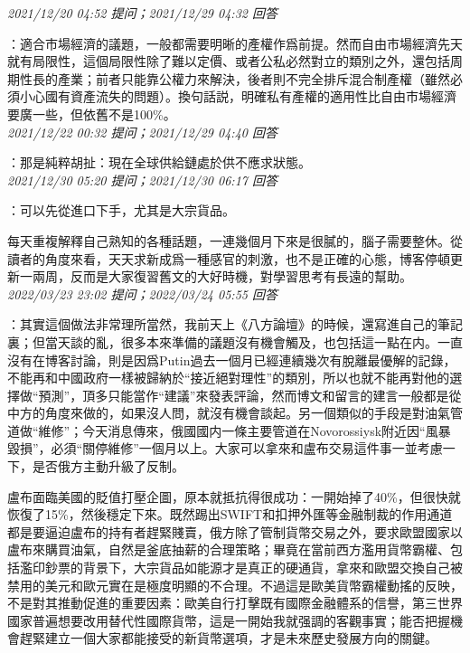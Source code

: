 \documentclass[twocolumn]{ctexart}
\begin{document}
\textit{\hfill\noindent\small 2021/12/20 04:52 提问；2021/12/29 04:32 回答}

：適合市場經濟的議題，一般都需要明晰的產權作爲前提。然而自由市場經濟先天就有局限性，這個局限性除了難以定價、或者公私必然對立的類別之外，還包括周期性長的產業；前者只能靠公權力來解決，後者則不完全排斥混合制產權（雖然必須小心國有資產流失的問題）。換句話説，明確私有產權的適用性比自由市場經濟要廣一些，但依舊不是100\%。
\\

\textit{\hfill\noindent\small 2021/12/22 00:32 提问；2021/12/29 04:40 回答}

：那是純粹胡扯：現在全球供給鏈處於供不應求狀態。
\\

\textit{\hfill\noindent\small 2021/12/30 05:20 提问；2021/12/30 06:17 回答}

：可以先從進口下手，尤其是大宗貨品。

每天重複解釋自己熟知的各種話題，一連幾個月下來是很膩的，腦子需要整休。從讀者的角度來看，天天求新成爲一種感官的刺激，也不是正確的心態，博客停頓更新一兩周，反而是大家復習舊文的大好時機，對學習思考有長遠的幫助。
\\

\textit{\hfill\noindent\small 2022/03/23 23:02 提问；2022/03/24 05:55 回答}

：其實這個做法非常理所當然，我前天上《八方論壇》的時候，還寫進自己的筆記裏；但當天談的亂，很多本來準備的議題沒有機會觸及，也包括這一點在内。一直沒有在博客討論，則是因爲Putin過去一個月已經連續幾次有脫離最優解的記錄，不能再和中國政府一樣被歸納於“接近絕對理性”的類別，所以也就不能再對他的選擇做“預測”，頂多只能當作“建議”來發表評論，然而博文和留言的建言一般都是從中方的角度來做的，如果沒人問，就沒有機會談起。另一個類似的手段是對油氣管道做“維修”；今天消息傳來，俄國國内一條主要管道在Novorossiysk附近因“風暴毀損”，必須“關停維修”一個月以上。大家可以拿來和盧布交易這件事一並考慮一下，是否俄方主動升級了反制。

盧布面臨美國的貶值打壓企圖，原本就抵抗得很成功：一開始掉了40\%，但很快就恢復了15\%，然後穩定下來。既然踢出SWIFT和扣押外匯等金融制裁的作用通道都是要逼迫盧布的持有者趕緊賤賣，俄方除了管制貨幣交易之外，要求歐盟國家以盧布來購買油氣，自然是釜底抽薪的合理策略；畢竟在當前西方濫用貨幣霸權、包括濫印鈔票的背景下，大宗貨品如能源才是真正的硬通貨，拿來和歐盟交換自己被禁用的美元和歐元實在是極度明顯的不合理。不過這是歐美貨幣霸權動搖的反映，不是對其推動促進的重要因素：歐美自行打擊既有國際金融體系的信譽，第三世界國家普遍想要改用替代性國際貨幣，這是一開始我就强調的客觀事實；能否把握機會趕緊建立一個大家都能接受的新貨幣選項，才是未來歷史發展方向的關鍵。
\\
\end{document}

